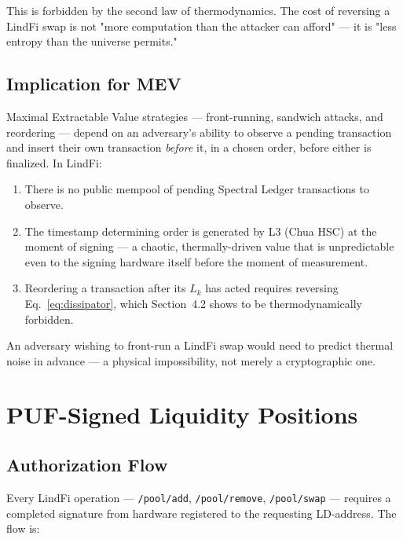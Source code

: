 \documentclass[11pt,a4paper]{article}
\begin{document}
This is forbidden by the second law of thermodynamics. The cost of reversing a LindFi swap is not "more computation than the attacker can afford" --- it is "less entropy than the universe permits."

\subsection{Implication for MEV}

Maximal Extractable Value strategies --- front-running, sandwich attacks, and reordering --- depend on an adversary's ability to observe a pending transaction and insert their own transaction \emph{before} it, in a chosen order, before either is finalized. In LindFi:

\begin{enumerate}
    \item There is no public mempool of pending Spectral Ledger transactions to observe.
    \item The timestamp determining order is generated by L3 (Chua HSC) at the moment of signing --- a chaotic, thermally-driven value that is unpredictable even to the signing hardware itself before the moment of measurement.
    \item Reordering a transaction after its $L_k$ has acted requires reversing Eq.~\eqref{eq:dissipator}, which Section~4.2 shows to be thermodynamically forbidden.
\end{enumerate}

An adversary wishing to front-run a LindFi swap would need to predict thermal noise in advance --- a physical impossibility, not merely a cryptographic one.

\section{PUF-Signed Liquidity Positions}
\label{sec:puf}

\subsection{Authorization Flow}

Every LindFi operation --- \texttt{/pool/add}, \texttt{/pool/remove}, \texttt{/pool/swap} --- requires a completed signature from hardware registered to the requesting LD-address. The flow is:
\end{document}
